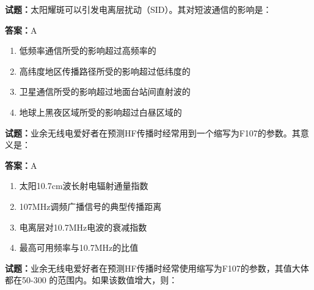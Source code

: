 \documentclass{ctexbook}
\begin{document}




\vspace{1em}

\textbf{试题：}太阳耀斑可以引发电离层扰动（SID）。其对短波通信的影响是： 

\textbf{答案：}A 

\begin{enumerate}[leftmargin=3em]
  \item 低频率通信所受的影响超过高频率的 

  \item 高纬度地区传播路径所受的影响超过低纬度的 

  \item 卫星通信所受的影响超过地面台站间直射波的 

  \item 地球上黑夜区域所受的影响超过白昼区域的 

\end{enumerate}





\vspace{1em}

\textbf{试题：}业余无线电爱好者在预测HF传播时经常用到一个缩写为F107的参数。其意义是： 

\textbf{答案：}A 

\begin{enumerate}[leftmargin=3em]
  \item 太阳10.7cm波长射电辐射通量指数 

  \item 107MHz调频广播信号的典型传播距离 

  \item 电离层对10.7MHz电波的衰减指数 

  \item 最高可用频率与10.7MHz的比值 

\end{enumerate}





\vspace{1em}

\textbf{试题：}业余无线电爱好者在预测HF传播时经常使用缩写为F107的参数，其值大体都在50-300
的范围内。如果该数值增大，则： 
\end{document}
